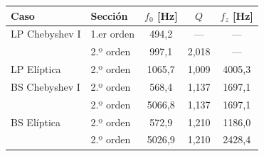 \begin{tabular}{@{}llccc@{}}
\toprule
Caso & Sección & $f_0$ [Hz] & $Q$ & $f_z$ [Hz] \\
\midrule
LP Chebyshev I & 1.er orden & 494{,}2 & --- & --- \\
 & 2.º orden & 997{,}1 & 2{,}018 & --- \\
\addlinespace
LP Elíptica & 2.º orden & 1065{,}7 & 1{,}009 & 4005{,}3 \\
\addlinespace
BS Chebyshev I & 2.º orden & 568{,}4 & 1{,}137 & 1697{,}1 \\
 & 2.º orden & 5066{,}8 & 1{,}137 & 1697{,}1 \\
\addlinespace
BS Elíptica & 2.º orden & 572{,}9 & 1{,}210 & 1186{,}0 \\
 & 2.º orden & 5026{,}9 & 1{,}210 & 2428{,}4 \\
\bottomrule
\end{tabular}